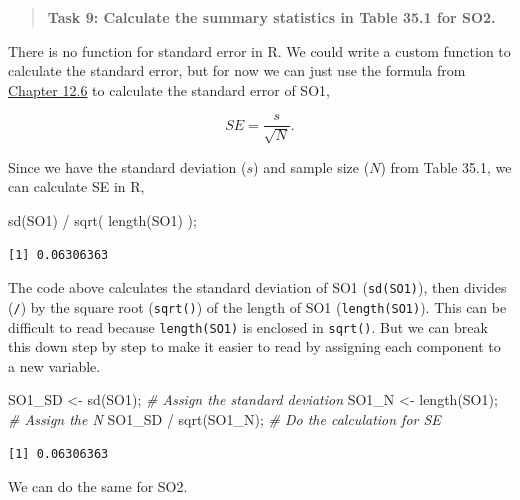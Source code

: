 \documentclass[
]{scrbook}
\newenvironment{Shaded}{\begin{snugshade}}{\end{snugshade}}
\newcommand{\CommentTok}[1]{\textcolor[rgb]{0.56,0.35,0.01}{\textit{#1}}}
\newcommand{\FunctionTok}[1]{\textcolor[rgb]{0.00,0.00,0.00}{#1}}
\newcommand{\NormalTok}[1]{#1}
\newcommand{\OtherTok}[1]{\textcolor[rgb]{0.56,0.35,0.01}{#1}}
\newcommand{\SpecialCharTok}[1]{\textcolor[rgb]{0.00,0.00,0.00}{#1}}
\begin{document}
\begin{quote}
\textbf{Task 9: Calculate the summary statistics in Table 35.1 for SO2.}
\end{quote}

There is no function for standard error in R.
We could write a custom function to calculate the standard error, but for now we can just use the formula from \protect\hyperlink{the-standard-error}{Chapter 12.6} to calculate the standard error of SO1,

\[SE = \frac{s}{\sqrt{N}}.\]

Since we have the standard deviation (\(s\)) and sample size (\(N\)) from Table 35.1, we can calculate SE in R,

\begin{Shaded}
\begin{Highlighting}[]
\FunctionTok{sd}\NormalTok{(SO1) }\SpecialCharTok{/} \FunctionTok{sqrt}\NormalTok{( }\FunctionTok{length}\NormalTok{(SO1) );}
\end{Highlighting}
\end{Shaded}

\begin{verbatim}
[1] 0.06306363
\end{verbatim}

The code above calculates the standard deviation of SO1 (\texttt{sd(SO1)}), then divides (\texttt{/}) by the square root (\texttt{sqrt()}) of the length of SO1 (\texttt{length(SO1)}).
This can be difficult to read because \texttt{length(SO1)} is enclosed in \texttt{sqrt()}.
But we can break this down step by step to make it easier to read by assigning each component to a new variable.

\begin{Shaded}
\begin{Highlighting}[]
\NormalTok{SO1\_SD }\OtherTok{\textless{}{-}} \FunctionTok{sd}\NormalTok{(SO1);     }\CommentTok{\# Assign the standard deviation}
\NormalTok{SO1\_N  }\OtherTok{\textless{}{-}} \FunctionTok{length}\NormalTok{(SO1); }\CommentTok{\# Assign the N}
\NormalTok{SO1\_SD }\SpecialCharTok{/} \FunctionTok{sqrt}\NormalTok{(SO1\_N);  }\CommentTok{\# Do the calculation for SE}
\end{Highlighting}
\end{Shaded}

\begin{verbatim}
[1] 0.06306363
\end{verbatim}

We can do the same for SO2.
\end{document}
